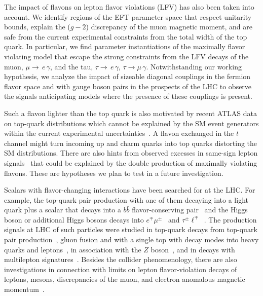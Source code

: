 \documentclass[prd,amsfonts,onecolumn,superscriptaddress,aps,nofootinbib,11pt]{revtex4-1}
\begin{document}
The impact of flavons on lepton flavor violations (LFV) has also been taken into account. We identify regions of the EFT parameter space that respect unitarity bounds, explain the ($g-2$) discrepancy of the muon  magnetic moment, and are safe from the current experimental constraints from the total width of the top quark. In particular, we find parameter instantiations of the maximally flavor violating model that escape the strong constraints from the LFV decays of the muon, $\mu\rightarrow\,e\,\gamma$, and the tau, $\tau\rightarrow\,e\,\gamma$, $\tau\rightarrow \mu\,\gamma$. Notwithstanding our working hypothesis, we analyze the impact of sizeable diagonal couplings in the fermion flavor space and with gauge boson pairs in the prospects of the LHC to observe the signals anticipating models where the presence of these couplings is present.

Such a flavon lighter than the top quark is also motivated by recent ATLAS data on top-quark distributions which cannot be explained by the SM event generators within the current experimental uncertainties~\cite{ATLAS:2023gsl,Banik:2023vxa}. A flavon exchanged in the $t$ channel might turn incoming up and charm quarks into top quarks distorting the SM distributions.  There are also hints from observed excesses in same-sign lepton signals~\cite{ATLAS:2022xnu} that could be explained by the double production of maximally violating flavons. These are hypotheses we plan to test in a future investigation.

Scalars with flavor-changing interactions have been searched for at the LHC. For example, the top-quark pair production with one of them decaying into a light quark plus a scalar that decays into a $b\bar{b}$ flavor-conserving pair~\cite{ATLAS:2023mcc} and the Higgs boson or additional Higgs bosons decays into $e^\mp\mu^\pm$~\cite{CMS:2023pte} and  $\tau^\pm\ell^\mp$~\cite{ATLAS:2019pmk}. The production signals at LHC of such particles were studied in top-quark decays from top-quark pair production~\cite{Carmona:2022jid,Bhattacharyya:2022umc}, gluon fusion and with a single top with decay modes into heavy quarks and leptons~\cite{Tsumura:2009yf}, in association with the $Z$ boson~\cite{Bhattacharyya:2022ciw},  and in decays with multilepton signatures~\cite{Hiller:2020fbu,Bissmann:2020lge}. Besides the collider phenomenology, there are also investigations in connection with limits on lepton flavor-violation decays of leptons, mesons,  discrepancies of the muon, and electron anomalous magnetic momentum~\cite{Cornella:2019uxs,Bauer:2019gfk,Carmona:2021seb,Muong-2:2006rrc,Muong-2:2015xgu,Muong-2:2023cdq,Hanneke_2008,Hanneke:2010au}. 
\end{document}
